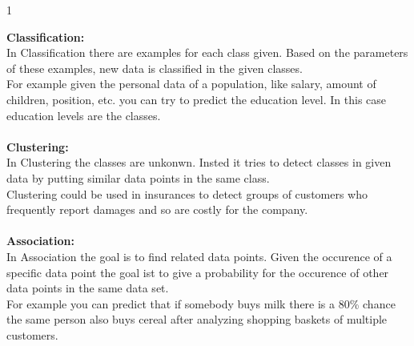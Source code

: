 \documentclass{article}
\begin{document}
\begin{ukon-infie}[01.11.17]{1}
\begin{exercise}[p=6]{}
\textbf{Classification:}\\
In Classification there are examples for each class given. Based on the parameters of these examples, new data is classified in the given classes.\\
For example given the personal data of a population, like salary, amount of children, position, etc. you can try to predict the education level. In this case education levels are the classes.\\\\
\textbf{Clustering:}\\
In Clustering the classes are unkonwn. Insted it tries to detect classes in given data by putting similar data points in the same class.\\
Clustering could be used in insurances to detect groups of customers who frequently report damages and so are costly for the company.\\\\
\textbf{Association:}\\
In Association the goal is to find related data points. Given the occurence of a specific data point the goal ist to give a probability for the occurence of other data points in the same data set.\\
For example you can predict that if somebody buys milk there is a 80\% chance the same person also buys cereal after analyzing shopping baskets of multiple customers.
\end{exercise}
\end{ukon-infie}
\end{document}
